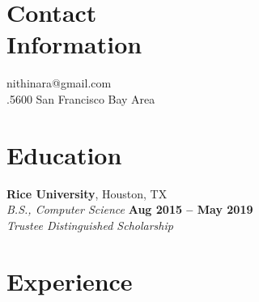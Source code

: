 \documentclass[margin,line]{resume}
\begin{document}

\begin{resume}

    \section{\mysidestyle Contact\\Information}

    nithinara@gmail.com \\
    .5600 \hfill
    San Francisco Bay Area

    \section{\mysidestyle Education}

    \textbf{Rice University}, Houston, TX \vspace{1mm}\\
    \textsl{B.S., Computer Science} \hfill \textbf{Aug 2015 -- May 2019} \vspace{1mm}\\
    \textsl{Trustee Distinguished Scholarship} 

\section{\mysidestyle Experience}


\end{resume}
\end{document}
